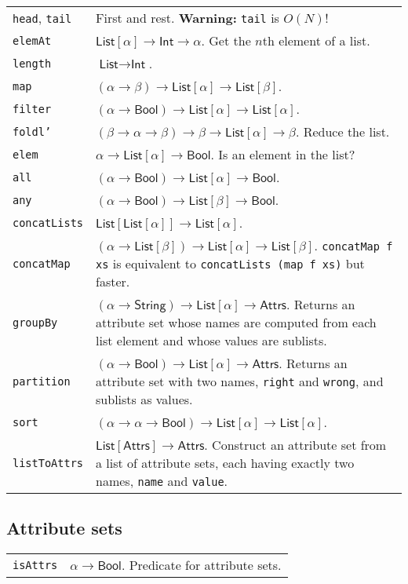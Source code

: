 \documentclass[9pt, a4paper, landscape]{extarticle}
\newcommand{\cmd}[1]{\texttt{#1}}
\newcommand{\str}{\textsf{String}}
\newcommand{\itg}{\textsf{Int}} %
\newcommand{\lst}{\textsf{List}}
\newcommand{\ats}{\textsf{Attrs}}
\newcommand{\bln}{\textsf{Bool}}
\begin{document}
\begin{multicols*}{3}
\begin{tabularx}{\columnwidth}{@{}l>{\raggedright\arraybackslash}X@{}}
  \cmd{head}, \cmd{tail} & First and rest. \textbf{Warning:} \cmd{tail}
  is $O(N)$! \\
  \cmd{elemAt}      & $\lst[\alpha] \to \itg \to \alpha$. Get the $n$th element of a list. \\
  \cmd{length}      & $\lst \to \itg$. \\
  
  \cmd{map}         & $(\alpha\to\beta)\to\lst[\alpha]\to\lst[\beta]$. \\
  \cmd{filter}      & $(\alpha\to\bln)\to\lst[\alpha]\to\lst[\alpha]$. \\
  \cmd{foldl'}      & $(\beta\to\alpha\to\beta)\to\beta\to\lst[\alpha]\to\beta$. Reduce the list.\\
  
  \cmd{elem}        & $\alpha\to\lst[\alpha]\to\bln$. Is an element in the list? \\
  \cmd{all}         & $(\alpha \to \bln) \to \lst[\alpha] \to \bln$. \\
  \cmd{any}         & $(\alpha \to \bln) \to \lst[\beta] \to \bln$. \\ 
  
  \cmd{concatLists} & $\lst[\lst[\alpha]]\to\lst[\alpha]$.\\
  \cmd{concatMap}   & $(\alpha\to\lst[\beta])\to\lst[\alpha]\to\lst[\beta]$. \cmd{concatMap f
    xs} is equivalent to \cmd{concatLists (map f xs)} but faster. \\

  \cmd{groupBy}     & $(\alpha\to\str)\to\lst[\alpha]\to\ats$. Returns an attribute
  set whose names are computed from each list element and whose values
  are sublists. \\
  \cmd{partition}   & $(\alpha\to\bln)\to\lst[\alpha]\to\ats$. Returns an attribute set
  with two names, \cmd{right} and \cmd{wrong}, and sublists as values. \\

  \cmd{sort}        & $(\alpha\to\alpha\to\bln)\to\lst[\alpha]\to\lst[\alpha]$. \\

  \cmd{listToAttrs} & $\lst[\ats]\to\ats$. Construct an attribute set
  from a list of attribute sets, each having exactly two names,
  \cmd{name} and \cmd{value}. \\
\end{tabularx}


\subsection*{Attribute sets}
\begin{tabularx}{\columnwidth}{@{}l>{\raggedright\arraybackslash}X@{}}
  \cmd{isAttrs} & $\alpha\to\bln$. Predicate for attribute sets. \\


\end{tabularx}
\end{multicols*}
\end{document}
